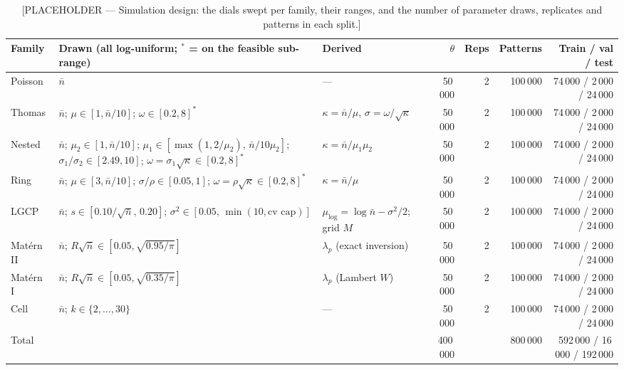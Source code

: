 \documentclass[twoside]{article}
\newcommand{\nb}{\bar n}
\begin{document}
\begin{table}[t]
\caption{[PLACEHOLDER — Simulation design: the dials swept per family, their ranges, and the number of parameter draws,
replicates and patterns in each split.]}
\label{tab:data}
\begin{center}
\footnotesize
\begin{tabular}{@{}l p{4.8cm} p{2.6cm} rrrr@{}}
\toprule
Family & Drawn (all log-uniform; $^\ast$ = on the feasible sub-range) & Derived & $\theta$ & Reps & Patterns & Train / val / test \\
\midrule
Poisson     & $\nb$ & --- & 50\,000 & 2 & 100\,000 & 74\,000 / 2\,000 / 24\,000 \\
Thomas      & $\nb$; $\mu\in[1,\nb/10]$; $\omega\in[0.2,8]^\ast$ & $\kappa=\nb/\mu$, $\sigma=\omega/\sqrt\kappa$ & 50\,000 & 2 & 100\,000 & 74\,000 / 2\,000 / 24\,000 \\
Nested      & $\nb$; $\mu_2\in[1,\nb/10]$; $\mu_1\in[\max(1,2/\mu_2),\,\nb/10\mu_2]$; $\sigma_1/\sigma_2\in[2.49,10]$; $\omega=\sigma_1\sqrt\kappa\in[0.2,8]^\ast$ & $\kappa=\nb/\mu_1\mu_2$ & 50\,000 & 2 & 100\,000 & 74\,000 / 2\,000 / 24\,000 \\
Ring        & $\nb$; $\mu\in[3,\nb/10]$; $\sigma/\rho\in[0.05,1]$; $\omega=\rho\sqrt\kappa\in[0.2,8]^\ast$ & $\kappa=\nb/\mu$ & 50\,000 & 2 & 100\,000 & 74\,000 / 2\,000 / 24\,000 \\
LGCP        & $\nb$; $s\in[0.10/\sqrt{\nb},\,0.20]$; $\sigma^2\in[0.05,\,\min(10,\text{cv cap})]$ & $\mu_{\log}=\log\nb-\sigma^2/2$; grid $M$ & 50\,000 & 2 & 100\,000 & 74\,000 / 2\,000 / 24\,000 \\
Mat\'ern II & $\nb$; $R\sqrt{\nb}\in[0.05,\sqrt{0.95/\pi}]$ & $\lambda_p$ (exact inversion) & 50\,000 & 2 & 100\,000 & 74\,000 / 2\,000 / 24\,000 \\
Mat\'ern I  & $\nb$; $R\sqrt{\nb}\in[0.05,\sqrt{0.35/\pi}]$ & $\lambda_p$ (Lambert $W$) & 50\,000 & 2 & 100\,000 & 74\,000 / 2\,000 / 24\,000 \\
Cell        & $\nb$; $k\in\{2,\dots,30\}$ & --- & 50\,000 & 2 & 100\,000 & 74\,000 / 2\,000 / 24\,000 \\
\midrule
Total       & & & 400\,000 & & 800\,000 & 592\,000 / 16\,000 / 192\,000 \\
\bottomrule
\end{tabular}
\end{center}
\end{table}
\end{document}
